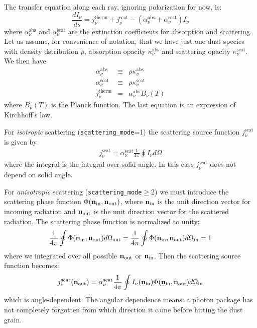 \documentclass{report}
\begin{document}
The transfer equation along each ray, ignoring polarization for now, is:
\begin{equation}
\label{eq-ray-tracing-rt}
\frac{dI_\nu}{ds} = j_\nu^{\mathrm{therm}} + j_\nu^{\mathrm{scat}} 
- (\alpha_\nu^{\mathrm{abs}}+\alpha_\nu^{\mathrm{scat}}) I_\nu
\end{equation}
where $\alpha_\nu^{\mathrm{abs}}$ and $\alpha_\nu^{\mathrm{scat}}$ are the
extinction coefficients for absorption and scattering.  Let us assume, for
convenience of notation, that we have just one dust species with density
dstribution $\rho$, absorption opacity $\kappa_\nu^{\mathrm{abs}}$ and
scattering opacity $\kappa_\nu^{\mathrm{scat}}$. We then have
\begin{eqnarray}
\alpha_\nu^{\mathrm{abs}} &\equiv& \rho\kappa_\nu^{\mathrm{abs}}\\
\alpha_\nu^{\mathrm{scat}} &\equiv& \rho\kappa_\nu^{\mathrm{scat}}\\
j_\nu^{\mathrm{therm}} &=& \alpha_\nu^{\mathrm{abs}} B_\nu(T)\label{eq-thermal-source-function}
\end{eqnarray}
where $B_\nu(T)$ is the Planck function. The last equation is an expression
of Kirchhoff's law. 

For {\em isotropic} scattering ({\small\tt scattering\_mode}=1) the
scattering source function $j_\nu^{\mathrm{scat}}$ is given by
\begin{eqnarray}
j_\nu^{\mathrm{scat}} = \alpha_\nu^{\mathrm{scat}} \frac{1}{4\pi}\oint I_\nu d\Omega
\end{eqnarray}
where the integral is the integral over solid angle. In this case
$j_\nu^{\mathrm{scat}}$ does not depend on solid angle. 

For {\em anisotropic} scattering ({\small\tt scattering\_mode}$\ge$2) we
must introduce the scattering phase function $\Phi({\bf n}_{\mathrm{in}},
{\bf n}_{\mathrm{out}})$, where
${\bf n}_{\mathrm{in}}$ is the unit direction vector for incoming radiation
and ${\bf n}_{\mathrm{out}}$ is the unit direction vector for the scattered
radiation. The 
scattering phase function is normalized to unity:
\begin{equation}
\frac{1}{4\pi}\oint\Phi({\bf n}_{\mathrm{in}},
{\bf n}_{\mathrm{out}}) d\Omega_{\mathrm{out}}
=\frac{1}{4\pi}\oint\Phi({\bf n}_{\mathrm{in}},
{\bf n}_{\mathrm{out}}) d\Omega_{\mathrm{in}}=1
\end{equation}
where we integrated over all possible ${\bf n}_{\mathrm{out}}$ or
${\bf n}_{\mathrm{in}}$.
Then the scattering source function becomes:
\begin{eqnarray}
j_\nu^{\mathrm{scat}}({\bf n}_{\mathrm{out}}) = 
\alpha_\nu^{\mathrm{scat}} \frac{1}{4\pi}\oint I_\nu({\bf n}_{\mathrm{in}})
\Phi({\bf n}_{\mathrm{in}},{\bf n}_{\mathrm{out}}) d\Omega_{\mathrm{in}}
\end{eqnarray}
which is angle-dependent. The angular dependence means: a photon package has
not completely forgotten from which direction it came before hitting the
dust grain. 
\end{document}
